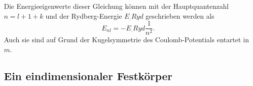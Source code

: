 Die Energieeigenwerte dieser Gleichung können mit der Hauptquantenzahl
$n=l+1+k$ und der Rydberg-Energie $E_.{Ryd}$ geschrieben werden als
\[
E_{n l}=-E_.{Ryd}\frac{1}{n^2}\text{.}
\]
Auch sie sind auf Grund der Kugelsymmetrie des Coulomb-Potentials entartet in $m$.
\subsection{Ein eindimensionaler Festkörper}



